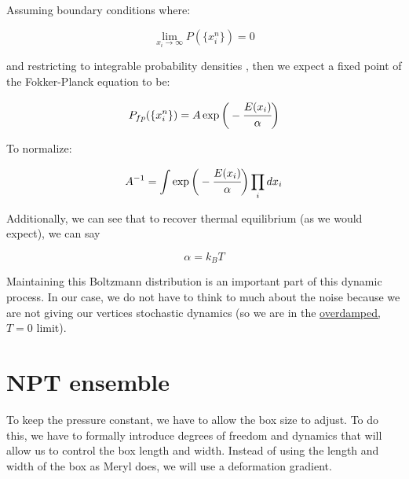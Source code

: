 \documentclass[12pt]{article}
\begin{document}
Assuming boundary conditions where:
\begin{center}
\begin{equation}
\lim_{x_i\to \infty} P(\{x_i^n\}) = 0
\end{equation}
\end{center}
and restricting to integrable probability densities , then we expect a fixed point of the Fokker-Planck equation to be:
\begin{center}
\begin{equation}
\label{eqn: fp}
P_{fp}(\{x_i^n\}) = A \exp\bigg(-\cfrac{E({x_i})}{\alpha}\bigg)
\end{equation}
\end{center} 
To normalize:
\begin{center}
\begin{equation}
\label{eqn: A}
A^{-1} = \int \exp \bigg(-\cfrac{E({x_i})}{\alpha}\bigg) \prod\limits_i d x_i
\end{equation}
\end{center}
Additionally, we can see that to recover thermal equilibrium (as we would expect), we can say 
\begin{center}
\begin{equation}
\label{eqn: alpha}
\alpha = k_B T
\end{equation}
\end{center}
Maintaining this Boltzmann distribution is an important part of this dynamic process. In our case, we do not have to think to much about the noise because we are not giving our vertices stochastic dynamics (so we are in the \ul{overdamped, $T = 0$} limit).
\section{NPT ensemble}
To keep the pressure constant, we have to allow the box size to adjust. To do this, we have to formally introduce degrees of freedom and dynamics that will allow us to control the box length and width.  Instead of using the length and width of the box as Meryl does, we will use a deformation gradient. \\ \\
\end{document}
